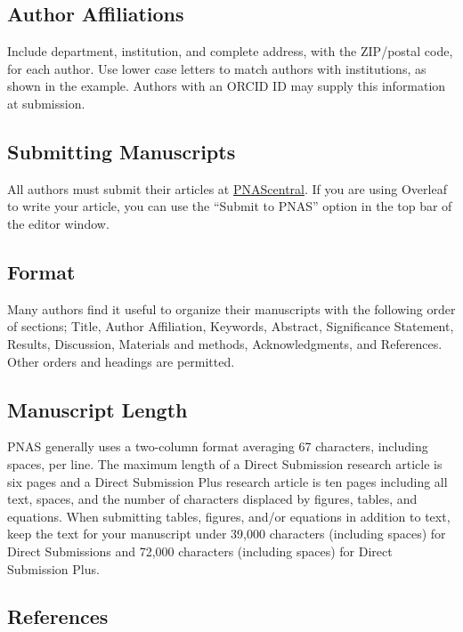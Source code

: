 \documentclass[9pt,twocolumn,twoside,lineno]{pnas-new}\usepackage[]{graphicx}\usepackage[]{xcolor}
\begin{document}
\subsection*{Author Affiliations}

Include department, institution, and complete address, with the ZIP/postal code, for each author. Use lower case letters to match authors with institutions, as shown in the example. Authors with an ORCID ID may supply this information at submission.

\subsection*{Submitting Manuscripts}

All authors must submit their articles at \href{http://www.pnascentral.org/cgi-bin/main.plex}{PNAScentral}. If you are using Overleaf to write your article, you can use the ``Submit to PNAS'' option in the top bar of the editor window. 

\subsection*{Format}

Many authors find it useful to organize their manuscripts with the following order of sections;  Title, Author Affiliation, Keywords, Abstract, Significance Statement, Results, Discussion, Materials and methods, Acknowledgments, and References. Other orders and headings are permitted.

\subsection*{Manuscript Length}

PNAS generally uses a two-column format averaging 67 characters, including spaces, per line. The maximum length of a Direct Submission research article is six pages and a Direct Submission Plus research article is ten pages including all text, spaces, and the number of characters displaced by figures, tables, and equations.  When submitting tables, figures, and/or equations in addition to text, keep the text for your manuscript under 39,000 characters (including spaces) for Direct Submissions and 72,000 characters (including spaces) for Direct Submission Plus.

\subsection*{References}
\end{document}
